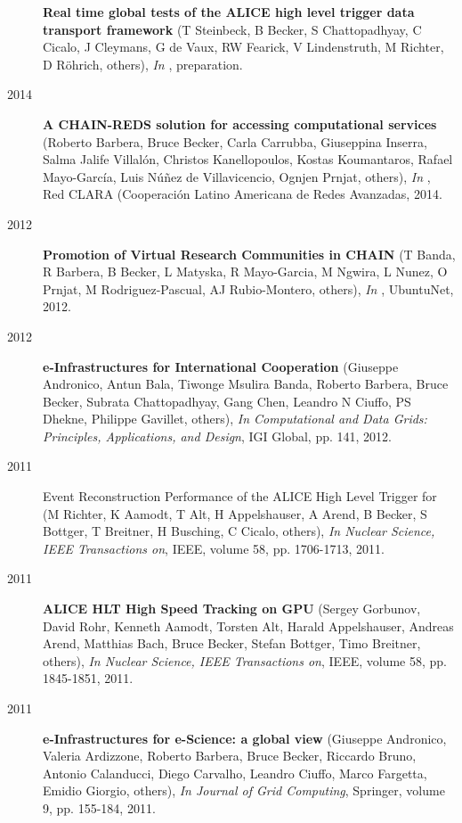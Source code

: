 \begin{description}
\item[]{\bf Real time global tests of the ALICE high level trigger data transport framework} (T Steinbeck, B Becker, S Chattopadhyay, C Cicalo, J Cleymans, G de Vaux, RW Fearick, V Lindenstruth, M Richter, D Röhrich, others), {\em In }, preparation.
\end{description}
\begin{description}
\item[2014]{\bf A CHAIN-REDS solution for accessing computational services} (Roberto Barbera, Bruce Becker, Carla Carrubba, Giuseppina Inserra, Salma Jalife Villalón, Christos Kanellopoulos, Kostas Koumantaros, Rafael Mayo-García, Luis Núñez de Villavicencio, Ognjen Prnjat, others), {\em In }, Red CLARA (Cooperación Latino Americana de Redes Avanzadas, 2014.
\item[2012]{\bf Promotion of Virtual Research Communities in CHAIN} (T Banda, R Barbera, B Becker, L Matyska, R Mayo-Garcia, M Ngwira, L Nunez, O Prnjat, M Rodriguez-Pascual, AJ Rubio-Montero, others), {\em In }, UbuntuNet, 2012.
\item[2012]{\bf e-Infrastructures for International Cooperation} (Giuseppe Andronico, Antun Bala\vz, Tiwonge Msulira Banda, Roberto Barbera, Bruce Becker, Subrata Chattopadhyay, Gang Chen, Leandro N Ciuffo, PS Dhekne, Philippe Gavillet, others), {\em In Computational and Data Grids: Principles, Applications, and Design}, IGI Global, pp. 141, 2012.
\item[2011]Event Reconstruction Performance of the ALICE High Level Trigger for (M Richter, K Aamodt, T Alt, H Appelshauser, A Arend, B Becker, S Bottger, T Breitner, H Busching, C Cicalo, others), {\em In Nuclear Science, IEEE Transactions on}, IEEE, volume 58, pp. 1706-1713, 2011.
\item[2011]{\bf ALICE HLT High Speed Tracking on GPU} (Sergey Gorbunov, David Rohr, Kenneth Aamodt, Torsten Alt, Harald Appelshauser, Andreas Arend, Matthias Bach, Bruce Becker, Stefan Bottger, Timo Breitner, others), {\em In Nuclear Science, IEEE Transactions on}, IEEE, volume 58, pp. 1845-1851, 2011.
\item[2011]{\bf e-Infrastructures for e-Science: a global view} (Giuseppe Andronico, Valeria Ardizzone, Roberto Barbera, Bruce Becker, Riccardo Bruno, Antonio Calanducci, Diego Carvalho, Leandro Ciuffo, Marco Fargetta, Emidio Giorgio, others), {\em In Journal of Grid Computing}, Springer, volume 9, pp. 155-184, 2011.

\end{description}
